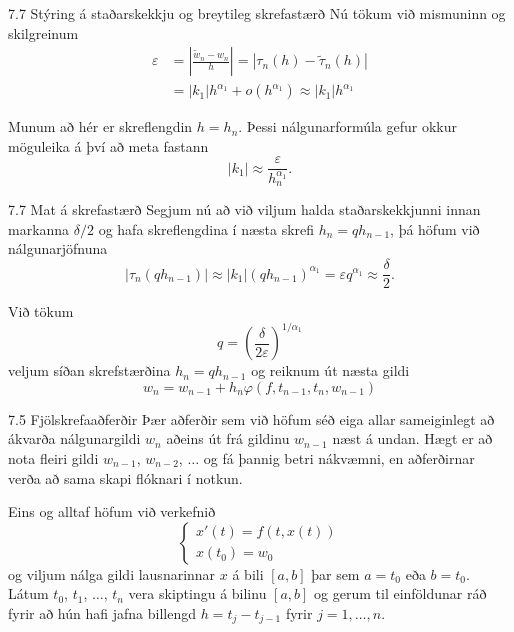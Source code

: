 \begin{frame}{7.7  Stýring á staðarskekkju og breytileg skrefastærð} 
Nú tökum við mismuninn og skilgreinum
\begin{align*}
\varepsilon 
&= \left|\frac{\tilde w_{n}-w_{n}}{h}\right|=|\tau_n(h)-\tilde
  \tau_n(h)|\\
&=|k_1|h^{\alpha_1}+o(h^{\alpha_1}) \approx |k_1|h^{\alpha_1}  
\end{align*}

\pause
Munum að hér er skreflengdin $h=h_{n}$.  
Þessi nálgunarformúla gefur
okkur möguleika á því að meta fastann 
$$|k_1|\approx
\dfrac\varepsilon{h_{n}^{\alpha_1}}.
$$
\end{frame}


\begin{frame}{7.7 Mat á skrefastærð} 
Segjum nú að við viljum halda
staðarskekkjunni innan markanna $\delta/2$ og hafa skreflengdina í
næsta skrefi $h_{n}=qh_{n-1}$, þá höfum við nálgunarjöfnuna
  $$ |\tau_n(qh_{n-1})|\approx |k_1|(qh_{n-1})^{\alpha_1}=
\varepsilon {q^{\alpha_1}} \approx  \frac{\delta} 2. $$

\pause
\smallskip
Við tökum 
  $$ q = \left(\frac{\delta}{2\varepsilon}\right)^{1/{\alpha_1}} $$
veljum síðan skrefstærðina $h_n = qh_{n-1}$ og reiknum út næsta gildi
$$ 
w_{n} = w_{n-1} + h_n\varphi(f,t_{n-1},t_n,w_{n-1}) 
$$
\end{frame}


% 
% 
% 


\begin{frame}{7.5 Fjölskrefaaðferðir} 
Þær aðferðir sem við höfum séð eiga allar sameiginlegt að ákvarða
nálgunargildi $w_{n}$ aðeins út frá gildinu $w_{n-1}$ næst á undan. Hægt
er að nota fleiri gildi $w_{n-1}$, $w_{n-2}$, $\ldots$ og fá þannig betri
nákvæmni, en aðferðirnar verða að sama skapi flóknari í notkun. 

\pause
\smallskip
Eins og alltaf höfum við verkefnið 
\begin{equation*}
  \left\{
    \begin{array}{l}
      x'(t) = f(t,x(t)) \\
      x(t_0) = w_0
    \end{array}
  \right.
\end{equation*}
og viljum nálga gildi lausnarinnar $x$ á bili $[a,b]$ þar sem $a =
t_0$ eða $b = t_0$. Látum $t_0$, $t_1$, $\ldots$, $t_n$ vera skiptingu
á bilinu $[a,b]$ og gerum til einföldunar ráð fyrir að hún hafi jafna
billengd $h=t_{j} - t_{j-1}$ fyrir $j= 1, \ldots, n$. 
\end{frame}


